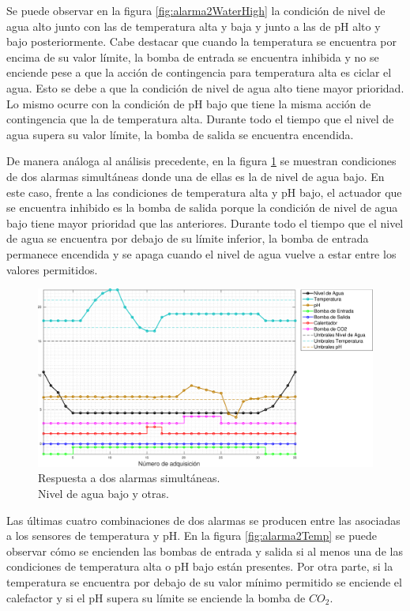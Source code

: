 Se puede observar en la figura \ref{fig:alarma2WaterHigh} la condición de nivel de agua alto junto con las de temperatura alta y baja y junto a las de pH alto y bajo posteriormente.  Cabe destacar que cuando la temperatura se encuentra por encima de su valor límite, la bomba de entrada se encuentra inhibida y no se enciende pese a que la acción de contingencia para temperatura alta es ciclar el agua.  Esto se debe a que la condición de nivel de agua alto tiene mayor prioridad.  Lo mismo ocurre con la condición de pH bajo que tiene la misma acción de contingencia que la de temperatura alta. Durante todo el tiempo que el nivel de agua supera su valor límite, la bomba de salida se encuentra encendida.

De manera análoga al análisis precedente, en la figura \ref{fig:alarma2WaterLow} se muestran condiciones de dos alarmas simultáneas donde una de ellas es la de nivel de agua bajo. En este caso, frente a las condiciones de temperatura alta y pH bajo, el actuador que se encuentra inhibido es la bomba de salida porque la condición de nivel de agua bajo tiene mayor prioridad que las anteriores. Durante todo el tiempo que el nivel de agua se encuentra por debajo de su límite inferior, la bomba de entrada permanece encendida y se apaga cuando el nivel de agua vuelve a estar entre los valores permitidos.

\vspace{20px}
\begin{figure}[htpb!]
\centering
    \includegraphics[width=\textwidth]{./Figures/plot2waterLow.pdf}
	\caption{Respuesta a dos alarmas simultáneas.\\ Nivel de agua bajo y otras.}
	\label{fig:alarma2WaterLow}
\end{figure}

Las últimas cuatro combinaciones de dos alarmas se producen entre las asociadas a los sensores de temperatura y pH.  En la figura \ref{fig:alarma2Temp} se puede observar cómo se encienden las bombas de entrada y salida si al menos una de las condiciones de temperatura alta o pH bajo están presentes.  Por otra parte, si la temperatura se encuentra por debajo de su valor mínimo permitido se enciende el calefactor y si el pH supera su límite se enciende la bomba de $CO_2$.


